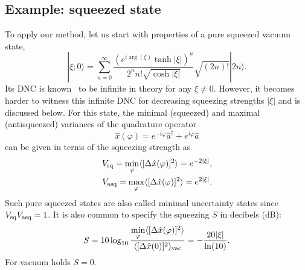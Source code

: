 \documentclass[aps,pra,twocolumn,showpacs,superscriptaddress,10pt]{revtex4-1}
\begin{document}
\subsection{Example: squeezed state}\label{sec:Examples}
	To apply our method, let us start with properties of a pure squeezed vacuum state,
	\begin{equation}
		|\xi;0\rangle=\sum_{n=0}^{\infty}\frac{(e^{i\arg(\xi)}\tanh|\xi|)^n}{2^nn!\sqrt{\cosh|\xi|}}\sqrt{(2n)!}|2n\rangle.\label{eq:sq_th}
	\end{equation}
	Its DNC is known~\cite{Vogel2014} to be infinite in theory for any $\xi\neq0$.
	However, it becomes harder to witness this infinite DNC for decreasing squeezing strengths $|\xi|$ \cite{Mraz2014} and is discussed below.
	For this state, the minimal (squeezed) and maximal (antisqueezed) variances of the quadrature operator 
	\begin{equation}
		\hat{x}(\varphi)=e^{-i\varphi}\hat{a}^\dag+e^{i\varphi}\hat{a} \label{eq:quadrOp}
	\end{equation}
	can be given in terms of the squeezing strength as
	\begin{align}
		V_{\rm sq}=\min\limits_\varphi\langle [\Delta\hat{x}(\varphi)]^2\rangle =e^{-2|\xi|},\nonumber\\ V_{\rm asq}=\max\limits_{\varphi}\langle [\Delta\hat{x}(\varphi)]^2\rangle =e^{2|\xi|}.
	\end{align}
	Such pure squeezed states are also called minimal uncertainty states since $V_{\rm sq}V_{\rm asq}=1$.
	It is also common to specify the squeezing $S$ in decibels (dB):
	\begin{equation}
		S=10\log_{10}\frac{\min\limits_\varphi\langle [\Delta\hat{x}(\varphi)]^2\rangle}{\langle[\Delta\hat{x}(0)]^2\rangle_{\rm vac}}=-\frac{20|\xi|}{\ln(10)}.
	\end{equation}
	For vacuum holds $S=0$.
\end{document}
